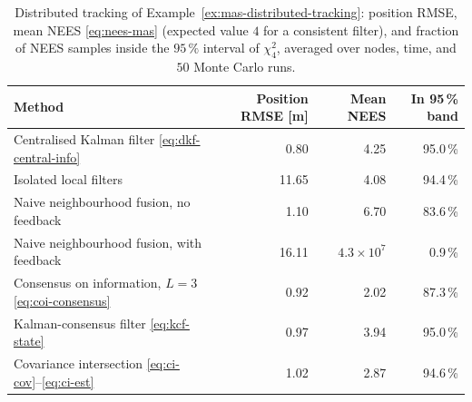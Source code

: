 \begin{table}[!t]
\centering
\small
\caption{Distributed tracking of Example~\ref{ex:mas-distributed-tracking}: position RMSE, mean NEES \eqref{eq:nees-mas} (expected value $4$ for a consistent filter), and fraction of NEES samples inside the $95\,\%$ interval of $\chi^{2}_{4}$, averaged over nodes, time, and $50$ Monte Carlo runs.}
\label{tab:mas-distributed-tracking}
\begin{tabular}{lrrr}
\hline
\textbf{Method} & \textbf{Position RMSE [m]} & \textbf{Mean NEES} & \textbf{In 95\,\% band} \\
\hline
Centralised Kalman filter \eqref{eq:dkf-central-info} & 0.80 & 4.25 & 95.0\,\% \\
Isolated local filters & 11.65 & 4.08 & 94.4\,\% \\
Naive neighbourhood fusion, no feedback & 1.10 & 6.70 & 83.6\,\% \\
Naive neighbourhood fusion, with feedback & 16.11 & $4.3\times10^{7}$ & 0.9\,\% \\
Consensus on information, $L=3$ \eqref{eq:coi-consensus} & 0.92 & 2.02 & 87.3\,\% \\
Kalman-consensus filter \eqref{eq:kcf-state} & 0.97 & 3.94 & 95.0\,\% \\
Covariance intersection \eqref{eq:ci-cov}--\eqref{eq:ci-est} & 1.02 & 2.87 & 94.6\,\% \\
\hline
\end{tabular}
\end{table}


